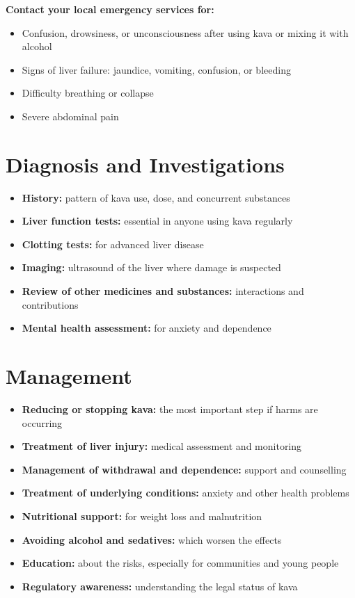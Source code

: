 \textbf{Contact your local emergency services for:}
\begin{itemize}
    \item Confusion, drowsiness, or unconsciousness after using kava or mixing it with alcohol
    \item Signs of liver failure: jaundice, vomiting, confusion, or bleeding
    \item Difficulty breathing or collapse
    \item Severe abdominal pain
\end{itemize}

\section*{Diagnosis and Investigations}
\begin{itemize}
    \item \textbf{History:} pattern of kava use, dose, and concurrent substances
    \item \textbf{Liver function tests:} essential in anyone using kava regularly
    \item \textbf{Clotting tests:} for advanced liver disease
    \item \textbf{Imaging:} ultrasound of the liver where damage is suspected
    \item \textbf{Review of other medicines and substances:} interactions and contributions
    \item \textbf{Mental health assessment:} for anxiety and dependence
\end{itemize}

\section*{Management}
\begin{itemize}
    \item \textbf{Reducing or stopping kava:} the most important step if harms are occurring
    \item \textbf{Treatment of liver injury:} medical assessment and monitoring
    \item \textbf{Management of withdrawal and dependence:} support and counselling
    \item \textbf{Treatment of underlying conditions:} anxiety and other health problems
    \item \textbf{Nutritional support:} for weight loss and malnutrition
    \item \textbf{Avoiding alcohol and sedatives:} which worsen the effects
    \item \textbf{Education:} about the risks, especially for communities and young people
    \item \textbf{Regulatory awareness:} understanding the legal status of kava
\end{itemize}

